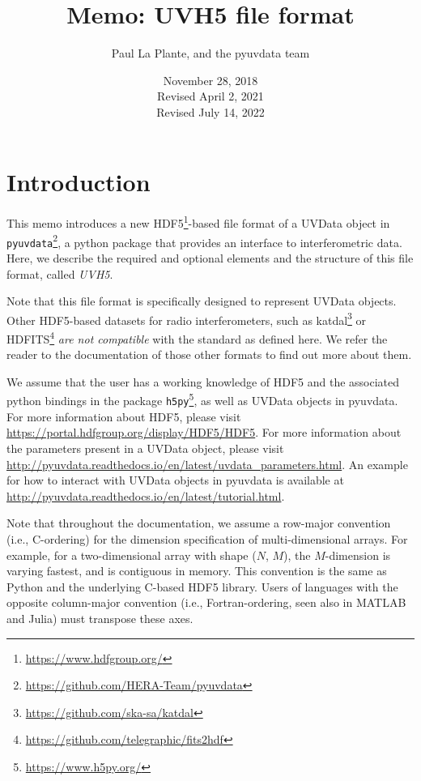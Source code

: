 \documentclass[11pt, oneside]{article}
\title{Memo: UVH5 file format}
\author{Paul La Plante, and the pyuvdata team}
\date{November 28, 2018\\
Revised April 2, 2021\\
Revised July 14, 2022
}
\begin{document}
\maketitle
\tableofcontents
\section{Introduction}
\label{sec:intro}
This memo introduces a new HDF5\footnote{\url{https://www.hdfgroup.org/}}-based
file format of a UVData object in
\verb+pyuvdata+\footnote{\url{https://github.com/HERA-Team/pyuvdata}}, a python
package that provides an interface to interferometric data. Here, we describe
the required and optional elements and the structure of this file format, called
\textit{UVH5}.

Note that this file format is specifically designed to represent UVData
objects. Other HDF5-based datasets for radio interferometers, such as
katdal\footnote{\url{https://github.com/ska-sa/katdal}} or
HDFITS\footnote{\url{https://github.com/telegraphic/fits2hdf}} \textit{are not
  compatible} with the standard as defined here. We refer the reader to the
documentation of those other formats to find out more about them.

We assume that the user has a working knowledge of HDF5 and the associated
python bindings in the package \verb+h5py+\footnote{\url{https://www.h5py.org/}}, as
well as UVData objects in pyuvdata. For more information about HDF5, please
visit \url{https://portal.hdfgroup.org/display/HDF5/HDF5}. For more information
about the parameters present in a UVData object, please visit
\url{http://pyuvdata.readthedocs.io/en/latest/uvdata_parameters.html}. An
example for how to interact with UVData objects in pyuvdata is available at
\url{http://pyuvdata.readthedocs.io/en/latest/tutorial.html}.

Note that throughout the documentation, we assume a row-major convention (i.e.,
C-ordering) for the dimension specification of multi-dimensional arrays. For
example, for a two-dimensional array with shape ($N$, $M$), the $M$-dimension is
varying fastest, and is contiguous in memory. This convention is the same as
Python and the underlying C-based HDF5 library. Users of languages with the
opposite column-major convention (i.e., Fortran-ordering, seen also in MATLAB
and Julia) must transpose these axes.
\end{document}
